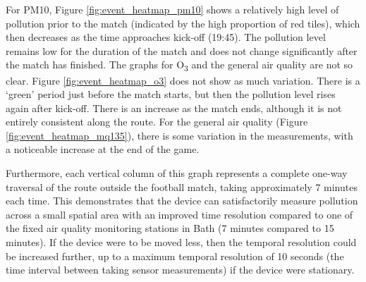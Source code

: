 \documentclass[11pt]{report}
\begin{document}
For PM10, Figure \ref{fig:event_heatmap_pm10} shows a relatively high level of pollution prior to the match (indicated by the high proportion of red tiles), which then decreases as the time approaches kick-off (19:45). The pollution level remains low for the duration of the match and does not change significantly after the match has finished. The graphs for O\textsubscript{3} and the general air quality are not so clear. Figure \ref{fig:event_heatmap_o3} does not show as much variation. There is a `green' period just before the match starts, but then the pollution level rises again after kick-off. There is an increase as the match ends, although it is not entirely consistent along the route. For the general air quality (Figure \ref{fig:event_heatmap_mq135}), there is some variation in the measurements, with a noticeable increase at the end of the game.

Furthermore, each vertical column of this graph represents a complete one-way traversal of the route outside the football match, taking approximately 7 minutes each time. This demonstrates that the device can satisfactorily measure pollution across a small spatial area with an improved time resolution compared to one of the fixed air quality monitoring stations in Bath (7 minutes compared to 15 minutes). If the device were to be moved less, then the temporal resolution could be increased further, up to a maximum temporal resolution of 10 seconds (the time interval between taking sensor measurements) if the device were stationary.

\end{document}
